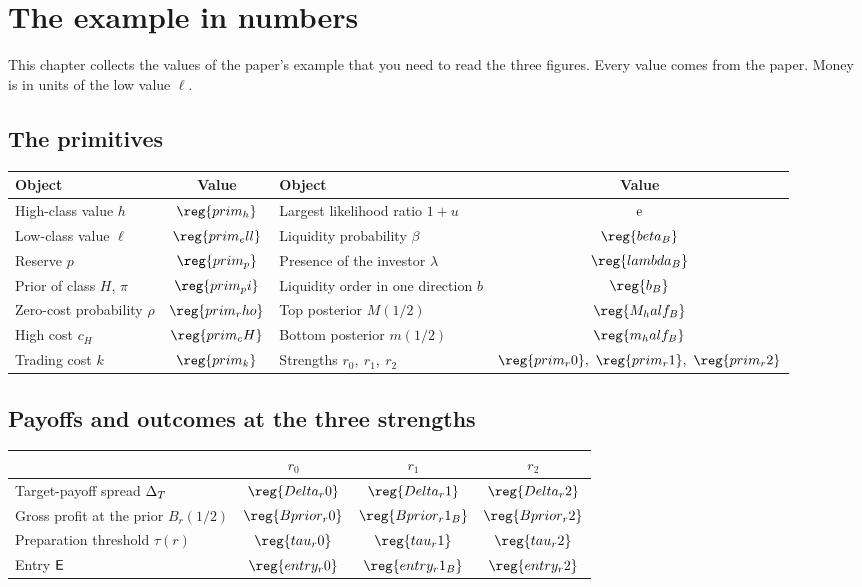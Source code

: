 \chapter{The example in numbers}\label{app:numbers}

This chapter collects the values of the paper's example that you need to read the three figures.
Every value comes from the paper. Money is in units of the low value \(\ell\).

\section{The primitives}

\begin{center}
\begin{tabular}{@{}lc@{\qquad}lc@{}}
\toprule
Object & Value & Object & Value\\
\midrule
High-class value \(h\) & \(\reg{prim_h}\) & Largest likelihood ratio \(1+u\) & \(\mathrm{e}\)\\
Low-class value \(\ell\) & \(\reg{prim_ell}\) & Liquidity probability \(\beta\) & \(\reg{beta_B}\)\\
Reserve \(p\) & \(\reg{prim_p}\) & Presence of the investor \(\lambda\) & \(\reg{lambda_B}\)\\
Prior of class \(H\), \(\pi\) & \(\reg{prim_pi}\) & Liquidity order in one direction \(b\) & \(\reg{b_B}\)\\
Zero-cost probability \(\rho\) & \(\reg{prim_rho}\) & Top posterior \(M(1/2)\) & \(\reg{M_half_B}\)\\
High cost \(c_H\) & \(\reg{prim_cH}\) & Bottom posterior \(m(1/2)\) & \(\reg{m_half_B}\)\\
Trading cost \(k\) & \(\reg{prim_k}\) & Strengths \(r_0,\ r_1,\ r_2\) & \(\reg{prim_r0},\ \reg{prim_r1},\ \reg{prim_r2}\)\\
\bottomrule
\end{tabular}
\end{center}

\section{Payoffs and outcomes at the three strengths}

\begin{center}
\begin{tabular}{@{}lccc@{}}
\toprule
 & \(r_0\) & \(r_1\) & \(r_2\)\\
\midrule
Target-payoff spread \(\Delta_T\) & \(\reg{Delta_r0}\) & \(\reg{Delta_r1}\) & \(\reg{Delta_r2}\)\\
Gross profit at the prior \(B_r(1/2)\) & \(\reg{Bprior_r0}\) & \(\reg{Bprior_r1_B}\) & \(\reg{Bprior_r2}\)\\
Preparation threshold \(\tau(r)\) & \(\reg{tau_r0}\) & \(\reg{tau_r1}\) & \(\reg{tau_r2}\)\\
Entry \(\mathsf{E}\) & \(\reg{entry_r0}\) & \(\reg{entry_r1_B}\) & \(\reg{entry_r2}\)\\
\bottomrule
\end{tabular}
\end{center}

